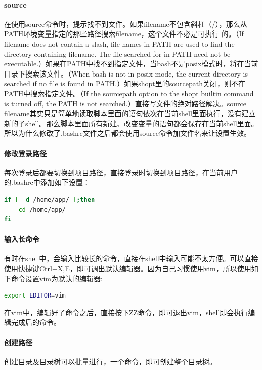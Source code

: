 \documentclass[letter]{book}
\begin{document}
\paragraph{source}在使用source命令时，提示找不到文件。如果filename不包含斜杠（/），那么从PATH环境变量指定的那些路径搜索filename，这个文件不必是可执行 的。（If filename does not contain a slash, file names in  PATH  are used  to  find the directory containing filename.  The file searched for in PATH need not be executable.）如果在PATH中找不到指定文件，当bash不是posix模式时，将在当前目录下搜索该文件。（When bash is not in posix mode, the current directory is searched if no file is found in PATH.）如果shopt里的sourcepath关闭，则不在PATH中搜索指定文件。（If  the sourcepath  option  to  the shopt builtin command is turned off, the PATH is not searched.）直接写文件的绝对路径解决。source filename其实只是简单地读取脚本里面的语句依次在当前shell里面执行，没有建立新的子shell。那么脚本里面所有新建、改变变量的语句都会保存在当前shell里面。所以为什么修改了.bashrc文件之后都会使用source命令加文件名来让设置生效。

\paragraph{修改登录路径}每次登录后都要切换到项目路径，直接登录时切换到项目路径，在当前用户的.bashrc中添加如下设置：

\begin{lstlisting}[language=Bash]
if [ -d /home/app/ ];then
	cd /home/app/
fi
\end{lstlisting}

\paragraph{输入长命令}有时在shell中，会输入比较长的命令，直接在shell中输入可能不太方便。可以直接使用快捷键Ctrl+X,E，即可调出默认编辑器。因为自己习惯使用vim，所以使用如下命令设置vim为默认的编辑器:

\begin{lstlisting}[language=Bash]
export EDITOR=vim
\end{lstlisting}

在vim中，编辑好了命令之后，直接按下ZZ命令，即可退出vim，shell即会执行编辑完成后的命令。

\paragraph{创建路径}创建目录及目录树可以批量进行，一个命令，即可创建整个目录树。
\end{document}
